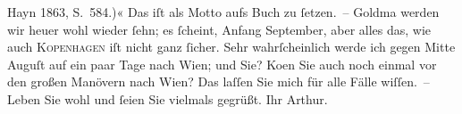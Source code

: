 \begin{ledgroupsized}[t]{13cm}
{{{{                        Hayn}{ }1863, S. 584.)}}}\label{K_L00467_1h}« Das iſt als Motto aufs Buch zu
               ſetzen. –\pend
           \pstart
           Goldma{\geminationn} werden wir heuer wohl wieder ſehn; es ſcheint, Anfang September,
               aber alles das, wie auch \textsc{Kopenhagen} iſt nicht ganz ſicher. Sehr wahrſcheinlich werde ich gegen Mitte
                  Auguſt auf ein paar Tage nach Wien; und
               Sie? Ko{\geminationm}en Sie auch noch einmal vor den großen Manövern
               nach Wien? Das {\pb}laſſen
               Sie mich für alle Fälle wiſſen. –\pend
           \pstart
           Leben Sie wohl und ſeien Sie vielmals gegrüßt.\pend
           \pstart Ihr \spacefill\mbox{Arthur.}\pend{}          \endnumbering{}\end{ledgroupsized}  \newcommand{\dateiname}{L00467}\newcommand{\titel}{Arthur Schnitzler an Hugo von Hofmannsthal, 28. 7. 1895}\newcommand{\editorInnen}{Martin Anton Müller und Gerd-Hermann Susen}
            \footnotesize
\begin{ledgroupsized}[t]{11.5cm}
\end{ledgroupsized}
         
      